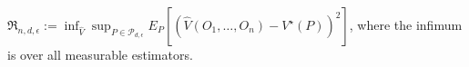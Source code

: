 \(\mathfrak R_{n,d,\epsilon}:=\inf_{\widehat V}\sup_{P\in\mathcal P_{d,\epsilon}}E_P[(\widehat V(O_1,\ldots,O_n)-V^\star(P))^2]\), where the infimum is over all measurable estimators.
